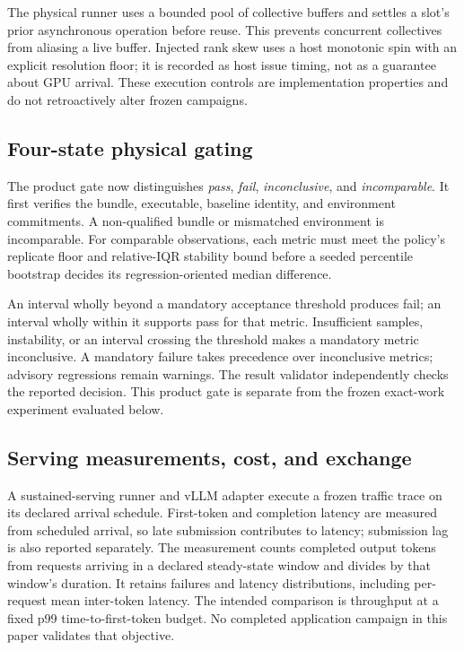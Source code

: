 \documentclass[10pt,twocolumn]{article}
\begin{document}
The physical runner uses a bounded pool of collective buffers and settles a
slot's prior asynchronous operation before reuse. This prevents concurrent
collectives from aliasing a live buffer. Injected rank skew uses a host
monotonic spin with an explicit resolution floor; it is recorded as host issue
timing, not as a guarantee about GPU arrival. These execution controls are
implementation properties and do not retroactively alter frozen campaigns.

\subsection{Four-state physical gating}

The product gate now distinguishes \emph{pass}, \emph{fail},
\emph{inconclusive}, and \emph{incomparable}. It first verifies the bundle,
executable, baseline identity, and environment commitments. A non-qualified
bundle or mismatched environment is incomparable. For comparable observations,
each metric must meet the policy's replicate floor and relative-IQR stability
bound before a seeded percentile bootstrap decides its regression-oriented
median difference.

An interval wholly beyond a mandatory acceptance threshold produces fail; an
interval wholly within it supports pass for that metric. Insufficient samples,
instability, or an interval crossing the threshold makes a mandatory metric
inconclusive. A mandatory failure takes precedence over inconclusive metrics;
advisory regressions remain warnings. The result validator independently
checks the reported decision. This product gate is separate from the frozen
exact-work experiment evaluated below.

\subsection{Serving measurements, cost, and exchange}

A sustained-serving runner and vLLM adapter execute a frozen traffic trace on
its declared arrival schedule. First-token and completion latency are measured
from scheduled arrival, so late submission contributes to latency; submission
lag is also reported separately. The measurement counts completed output
tokens from requests arriving in a declared steady-state window and divides
by that window's duration. It retains failures and latency distributions,
including per-request mean inter-token latency. The intended comparison is
throughput at a fixed p99 time-to-first-token budget. No completed application
campaign in this paper validates that objective.
\end{document}
